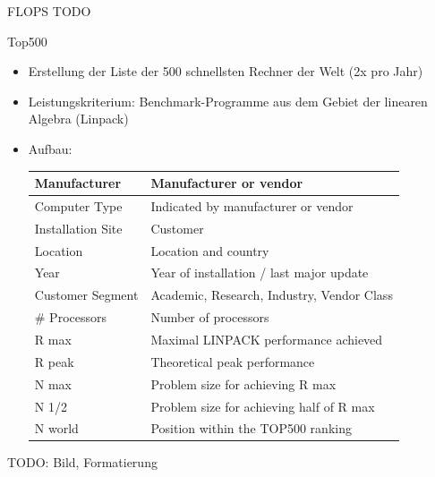 \begin{example}[Leistungsmaß]{FLOPS}
    TODO
\end{example}

\begin{bonus}{Top500}
    \begin{itemize}
        \item Erstellung der Liste der 500 schnellsten Rechner der Welt (2x pro Jahr)
        \item Leistungskriterium: Benchmark-Programme aus dem Gebiet der linearen Algebra (Linpack)
        \item Aufbau:\\
              \begin{tabular}{|l|l|}
                  \hline
                  Manufacturer      & Manufacturer or vendor                     \\
                  \hline
                  Computer Type     & Indicated by manufacturer or vendor        \\
                  \hline
                  Installation Site & Customer                                   \\
                  \hline
                  Location          & Location and country                       \\
                  \hline
                  Year              & Year of installation / last major update   \\
                  \hline
                  Customer Segment  & Academic, Research, Industry, Vendor Class \\
                  \hline
                  \# Processors     & Number of processors                       \\
                  \hline
                  R max             & Maximal LINPACK performance achieved       \\
                  \hline
                  R peak            & Theoretical peak performance               \\
                  \hline
                  N max             & Problem size for achieving R max           \\
                  \hline
                  N 1/2             & Problem size for achieving half of R max   \\
                  \hline
                  N world           & Position within the TOP500 ranking         \\
                  \hline
              \end{tabular}
    \end{itemize}
    TODO: Bild, Formatierung
\end{bonus}

